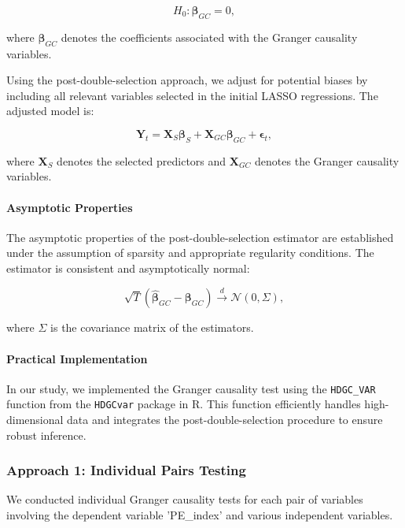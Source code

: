 \documentclass[12pt]{article}
\begin{document}
\[
H_0: \boldsymbol{\beta}_{GC} = 0,
\]

where \(\boldsymbol{\beta}_{GC}\) denotes the coefficients associated with the Granger causality variables.

Using the post-double-selection approach, we adjust for potential biases by including all relevant variables selected in the initial LASSO regressions. The adjusted model is:

\[
\mathbf{Y}_t = \mathbf{X}_{S} \boldsymbol{\beta}_{S} + \mathbf{X}_{GC} \boldsymbol{\beta}_{GC} + \boldsymbol{\epsilon}_t,
\]

where \(\mathbf{X}_{S}\) denotes the selected predictors and \(\mathbf{X}_{GC}\) denotes the Granger causality variables.

\paragraph{Asymptotic Properties}

The asymptotic properties of the post-double-selection estimator are established under the assumption of sparsity and appropriate regularity conditions. The estimator is consistent and asymptotically normal:

\[
\sqrt{T} (\hat{\boldsymbol{\beta}}_{GC} - \boldsymbol{\beta}_{GC}) \xrightarrow{d} \mathcal{N}(0, \Sigma),
\]

where \(\Sigma\) is the covariance matrix of the estimators.

\paragraph{Practical Implementation}

In our study, we implemented the Granger causality test using the \texttt{HDGC\_VAR} function from the \texttt{HDGCvar} package in R. This function efficiently handles high-dimensional data and integrates the post-double-selection procedure to ensure robust inference.

\subsubsection{Approach 1: Individual Pairs Testing}

We conducted individual Granger causality tests for each pair of variables involving the dependent variable 'PE\_index' and various independent variables.
\end{document}

